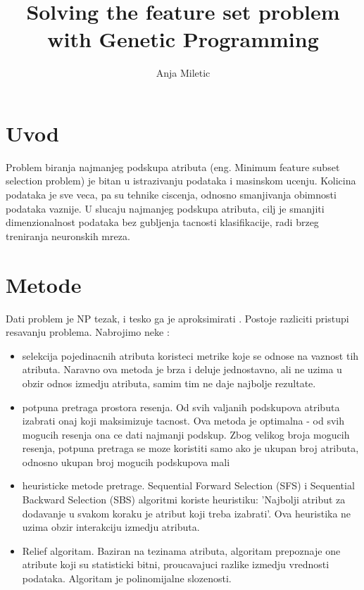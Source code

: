 \documentclass[11pt]{article} %
\title{Solving the feature set problem with Genetic Programming}
\author{Anja Miletic}
\begin{document}
\maketitle
\newpage

\doublespacing
\tableofcontents
\singlespacing
\newpage


\section{Uvod}
Problem biranja najmanjeg podskupa atributa (eng. Minimum feature subset selection problem) je bitan u istrazivanju podataka i masinskom ucenju. Kolicina podataka je sve veca, pa su tehnike ciscenja, odnosno smanjivanja obimnosti podataka vaznije. U slucaju najmanjeg podskupa atributa, cilj je smanjiti dimenzionalnost podataka bez gubljenja tacnosti klasifikacije, radi brzeg treniranja neuronskih mreza. 

\section{Metode}
Dati problem je NP tezak, i tesko ga je aproksimirati \cite{VanHorn}. Postoje razliciti pristupi resavanju problema. Nabrojimo neke \cite{Kira}:
\begin{itemize}
\item selekcija pojedinacnih atributa koristeci metrike koje se odnose na vaznost tih atributa. Naravno ova metoda je brza i deluje jednostavno, ali ne uzima u obzir odnos izmedju atributa, samim tim ne daje najbolje rezultate.
\item potpuna pretraga prostora resenja. Od svih valjanih podskupova atributa izabrati onaj koji maksimizuje tacnost. Ova metoda je optimalna - od svih mogucih resenja ona ce dati najmanji podskup.  Zbog velikog broja mogucih resenja, potpuna pretraga se moze koristiti samo ako je ukupan broj atributa, odnosno ukupan broj mogucih podskupova mali
\item heuristicke metode pretrage. Sequential Forward Selection (SFS) i Sequential Backward Selection (SBS) algoritmi koriste heuristiku: 'Najbolji atribut za dodavanje u svakom koraku je atribut koji treba izabrati'. Ova heuristika ne uzima obzir interakciju izmedju atributa.
\item Relief algoritam. Baziran na tezinama atributa, algoritam prepoznaje one atribute koji su statisticki bitni, proucavajuci razlike izmedju vrednosti podataka. Algoritam je polinomijalne slozenosti.
\end{itemize} 
\end{document}
